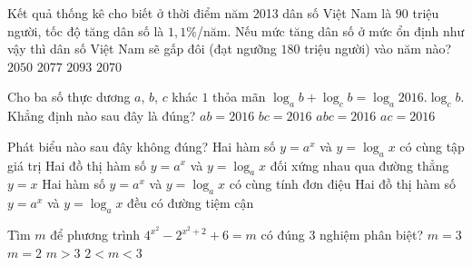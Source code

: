 \begin{ex}%
	Kết quả thống kê cho biết ở thời điểm năm 2013 dân số Việt Nam là $90$ triệu người, tốc độ tăng dân số là $1,1$\%/năm. Nếu mức tăng dân số ở mức ổn định như vậy thì dân số Việt Nam sẽ gấp đôi (đạt ngưỡng $180$ triệu người) vào năm nào?
	\choice
	{$2050$}
	{\True $2077$}
	{$2093$}
	{$2070$}
\end{ex}

\begin{ex}%
	Cho ba số thực dương $a$, $b$, $c$ khác $1$ thỏa mãn $\log_ab+\log_cb=\log_a2016.\log_cb$. Khẳng định nào sau đây là đúng?
	\choice
	{$ab=2016$}
	{$bc=2016$}
	{$abc=2016$}
	{\True $ac=2016$}
\end{ex}

\begin{ex}%
	Phát biểu nào sau đây không đúng?
	\choice
	{\True Hai hàm số $y=a^x$ và $y=\log_ax$ có cùng tập giá trị}
	{Hai đồ thị hàm số $y=a^x$ và $y=\log_ax$ đối xứng nhau qua đường thẳng $y=x$}
	{Hai hàm số $y=a^x$ và $y=\log_ax$ có cùng tính đơn điệu}
	{Hai đồ thị hàm số $y=a^x$ và $y=\log_ax$ đều có đường tiệm cận}	
	\loigiai{	
	}
\end{ex} 

\begin{ex}%
	Tìm $m$ để phương trình $4^{x^2}-2^{x^2+2}+6=m$ có đúng 3 nghiệm phân biệt?
	\choice
	{\True $m=3$}
	{$m=2$}
	{$m>3$}
	{$2<m<3$}
\end{ex}

